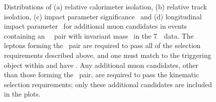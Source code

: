 \begin{figure}[h]
\centering
    \caption[ Distributions of relative track and calorimeter isolation, \dzerosig\
    and \zzero\ for additional muon candidates in events containing a dilepton pair with mass
    \sstooos\ in 7~\tev\ data.]
    {Distributions of (a) relative calorimeter isolation,
    (b) relative track isolation, (c) impact parameter significance \dzerosig\ and
    (d) longitudinal impact parameter \zzero\ for additional muon candidates
    in events containing an \ossf\ \dilepton\ pair with invariant mass \sstooos\
    in the 7~\tev\ data.
    The leptons forming the \dilepton\ pair are required to pass all of the
    selection requirements described above, and one must match to the triggering
    object within \deltaRlt{0.1} and have \ptgt{25}. Any additional muon candidates, other than those forming the
    \dilepton\ pair, are required to pass the kinematic selection requirements; only
    these additional candidates are included in the plots.}
\label{fig:objsel-mu}
\end{figure}
